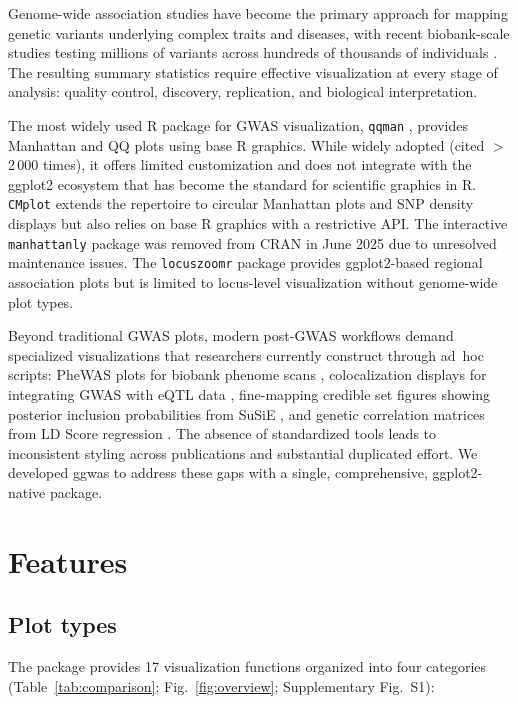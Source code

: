 \documentclass{bioinfo}
\begin{document}
Genome-wide association studies have become the primary approach for mapping genetic variants underlying complex traits and diseases, with recent biobank-scale studies testing millions of variants across hundreds of thousands of individuals \citep{bycroft2018,kurki2023}. The resulting summary statistics require effective visualization at every stage of analysis: quality control, discovery, replication, and biological interpretation.

The most widely used R package for GWAS visualization, \texttt{qqman} \citep{turner2018}, provides Manhattan and QQ plots using base R graphics. While widely adopted (cited $>$2\,000 times), it offers limited customization and does not integrate with the ggplot2 ecosystem \citep{wickham2016} that has become the standard for scientific graphics in R. \texttt{CMplot} \citep{yin2024} extends the repertoire to circular Manhattan plots and SNP density displays but also relies on base R graphics with a restrictive API. The interactive \texttt{manhattanly} package was removed from CRAN in June 2025 due to unresolved maintenance issues. The \texttt{locuszoomr} package \citep{lewis2025} provides ggplot2-based regional association plots but is limited to locus-level visualization without genome-wide plot types.

Beyond traditional GWAS plots, modern post-GWAS workflows demand specialized visualizations that researchers currently construct through ad~hoc scripts: PheWAS plots for biobank phenome scans \citep{denny2013}, colocalization displays for integrating GWAS with eQTL data \citep{giambartolomei2014}, fine-mapping credible set figures showing posterior inclusion probabilities from SuSiE \citep{wang2020}, and genetic correlation matrices from LD Score regression \citep{bulik2015}. The absence of standardized tools leads to inconsistent styling across publications and substantial duplicated effort. We developed ggwas to address these gaps with a single, comprehensive, ggplot2-native package.

\section{Features}

\subsection{Plot types}

The package provides 17 visualization functions organized into four categories (Table~\ref{tab:comparison}; Fig.~\ref{fig:overview}; Supplementary Fig.~S1):
\end{document}
